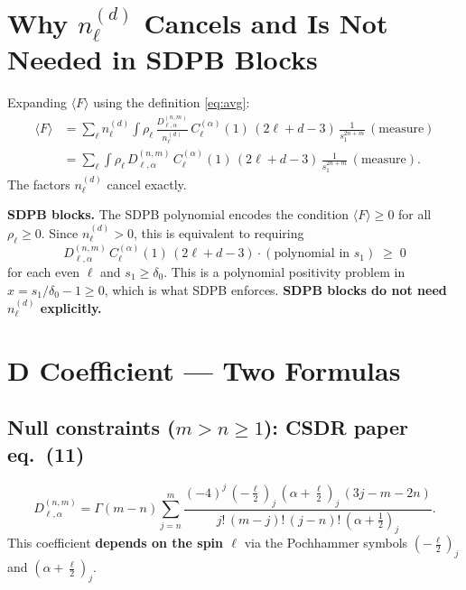 \documentclass{article}
\begin{document}
\section{Why $n_\ell^{(d)}$ Cancels and Is Not Needed in SDPB Blocks}

Expanding $\langle F\rangle$ using the definition \eqref{eq:avg}:
\begin{align}
  \langle F\rangle
  &= \sum_\ell n_\ell^{(d)}\int\rho_\ell\,
     \frac{D_{\ell,\alpha}^{(n,m)}}{n_\ell^{(d)}}\,
     C_\ell^{(\alpha)}(1)\,(2\ell+d-3)\,\frac{1}{s_1^{2n+m}}\,(\text{measure}) \nonumber\\
  &= \sum_\ell \int\rho_\ell\,
     D_{\ell,\alpha}^{(n,m)}\,C_\ell^{(\alpha)}(1)\,(2\ell+d-3)\,
     \frac{1}{s_1^{2n+m}}\,(\text{measure}).
\end{align}
The factors $n_\ell^{(d)}$ cancel exactly.

\begin{mdframed}[backgroundcolor=green!15]
\textbf{SDPB blocks.}
The SDPB polynomial encodes the condition $\langle F\rangle\ge0$ for all
$\rho_\ell\ge0$.  Since $n_\ell^{(d)}>0$, this is equivalent to requiring
\[
  D_{\ell,\alpha}^{(n,m)}\,C_\ell^{(\alpha)}(1)\,(2\ell+d-3) \cdot (\text{polynomial in }s_1)\;\ge\;0
\]
for each even $\ell$ and $s_1\ge\delta_0$.  This is a polynomial positivity
problem in $x = s_1/\delta_0 - 1 \ge 0$, which is what SDPB enforces.
\textbf{SDPB blocks do not need $n_\ell^{(d)}$ explicitly.}
\end{mdframed}

\section{D Coefficient — Two Formulas}\label{sec:D}

\subsection{Null constraints ($m > n \ge 1$): CSDR paper eq.~(11)}

\begin{equation}\label{eq:D_null}
  D_{\ell,\alpha}^{(n,m)}
  = \Gamma(m-n)\sum_{j=n}^{m}
    \frac{(-4)^j\,(-\tfrac{\ell}{2})_j\,(\alpha+\tfrac{\ell}{2})_j\,(3j-m-2n)}
         {j!\,(m-j)!\,(j-n)!\,(\alpha+\tfrac{1}{2})_j}.
\end{equation}
This coefficient \textbf{depends on the spin $\ell$} via the Pochhammer symbols
$(-\tfrac{\ell}{2})_j$ and $(\alpha+\tfrac{\ell}{2})_j$.
\end{document}
